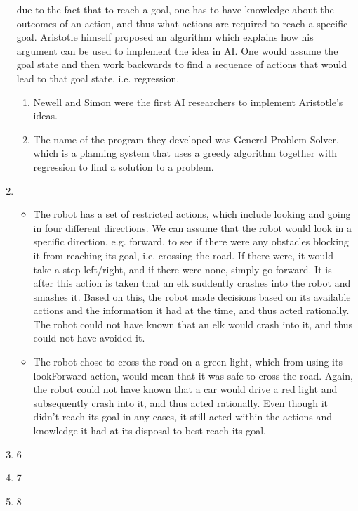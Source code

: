 \begin{enumerate}
    due to the fact that to reach a goal, one has to have knowledge about the 
    outcomes of an action, and thus what actions are required to reach a 
    specific goal. Aristotle himself proposed an algorithm which explains how
    his argument can be used to implement the idea in AI. One would assume the 
    goal state and then work backwards to find a sequence of actions that would
    lead to that goal state, i.e. regression.
    \begin{enumerate}
        \item 
            Newell and Simon were the first AI researchers to implement 
            Aristotle's ideas.
        \item 
            The name of the program they developed was General Problem Solver, 
            which is a planning system that uses a greedy algorithm together
            with regression to find a solution to a problem.
    \end{enumerate} 
    \autocite[p.~25]{russell2021artificial}
  \item 
    \begin{itemize}
    \item
        The robot has a set of restricted actions, which include looking and 
        going in four different directions. We can assume that the robot would 
        look in a specific direction, e.g. forward, to see if there were any 
        obstacles blocking it from reaching its goal, i.e. crossing the road. 
        If there were, it would take a step left/right, and if there were none, 
        simply go forward. It is after this action is taken that an elk 
        suddently crashes into the robot and smashes it. Based on this, the 
        robot made decisions based on its available actions and the information 
        it had at the time, and thus acted rationally. The robot could not have 
        known that an elk would crash into it, and thus could not have avoided 
        it. 
    \item
        The robot chose to cross the road on a green light, which from using its 
        lookForward action, would mean that it was safe to cross the road. 
        Again, the robot could not have known that a car would drive a red light 
        and subsequently crash into it, and thus acted rationally. Even though 
        it didn't reach its goal in any cases, it still acted within the actions 
        and knowledge it had at its disposal to best reach its goal.
    \end{itemize}
  \item 6
  \item 7
  \item 8
\end{enumerate}

